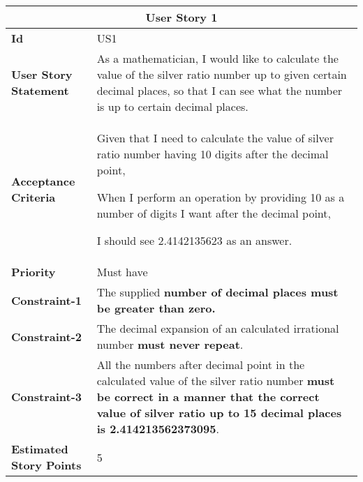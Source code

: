 \begin{center}
\begin{tabular}{ | m{2.3cm} | m{12cm} | } 

 \hline
 \multicolumn{2}{|c|}{\textbf{User Story 1}} \\

\hline
\textbf{Id} & US1 \\ 

\hline
\textbf{User Story Statement} & As a mathematician, I would like to calculate the value of the silver ratio number up to given certain decimal places, so that I can see what the number is up to certain decimal places. \\ 

\hline
\textbf{Acceptance Criteria} & Given that I need to calculate the value of silver ratio number having 10 digits after the decimal point,

When I perform an operation by providing 10 as a number of digits I want after the decimal point,

I should see 2.4142135623 as an answer.\\ 

\hline
\textbf{Priority} & Must have \\ 

\hline
\textbf{Constraint-1} & The supplied \textbf{number of decimal places must be greater than zero.} \\ 

\hline
\textbf{Constraint-2} & The decimal expansion of an calculated irrational number \textbf{must never repeat}.\\ 

\hline
\textbf{Constraint-3} & All the numbers after decimal point in the calculated value of the silver ratio number \textbf{must be correct in a manner that the correct value of silver ratio up to 15 decimal places is 2.414213562373095}.\\ 

\hline
\textbf{Estimated Story Points} & 5 \\ 
\hline

\end{tabular}
\end{center}

